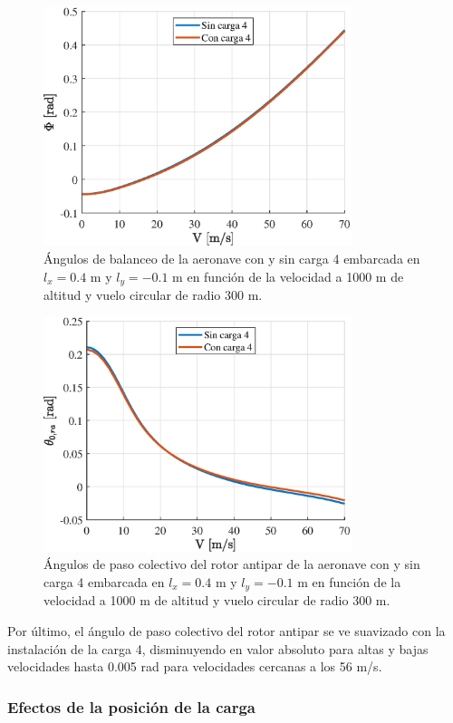 \begin{figure}
	\centering
	\includegraphics[width=90mm]{graficos/BalanVCSP}
	\caption{Ángulos de balanceo de la aeronave con y sin carga 4 embarcada en $l_x=0.4$ m y $l_y=-0.1$ m en función de la velocidad a 1000 m de altitud y vuelo circular de radio 300 m.}
	\label{PhiVCSP}
\end{figure}
\begin{figure}
	\centering
 	\includegraphics[width=90mm]{graficos/theta0raVCSP}
	\caption{Ángulos de paso colectivo del rotor antipar de la aeronave con y sin carga 4 embarcada en $l_x=0.4$ m y $l_y=-0.1$ m en función de la velocidad a 1000 m de altitud y vuelo circular de radio 300 m.}
	\label{Theta0raVCSP}
\end{figure}

Por último, el ángulo de paso colectivo del rotor antipar se ve suavizado con la instalación de la carga 4, disminuyendo en valor absoluto para altas y bajas velocidades hasta 0.005 rad para velocidades cercanas a los 56 m/s.


\subsubsection*{Efectos de la posición de la carga}

